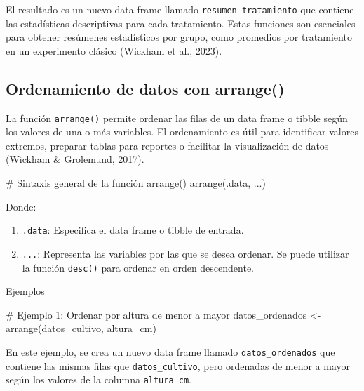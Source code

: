 \documentclass[
  spanish,
  a4paper,
  DIV=11,
  numbers=noendperiod,
  onepage,
  openany]{scrreprt}
\newenvironment{Shaded}{\begin{snugshade}}{\end{snugshade}}
\newcommand{\CommentTok}[1]{\textcolor[rgb]{0.37,0.37,0.37}{#1}}
\newcommand{\FunctionTok}[1]{\textcolor[rgb]{0.28,0.35,0.67}{#1}}
\newcommand{\NormalTok}[1]{\textcolor[rgb]{0.00,0.23,0.31}{#1}}
\newcommand{\OtherTok}[1]{\textcolor[rgb]{0.00,0.23,0.31}{#1}}
\begin{document}
El resultado es un nuevo data frame llamado
\texttt{resumen\_tratamiento} que contiene las estadísticas descriptivas
para cada tratamiento. Estas funciones son esenciales para obtener
resúmenes estadísticos por grupo, como promedios por tratamiento en un
experimento clásico (Wickham et al., 2023).

\subsection{Ordenamiento de datos con
arrange()}\label{ordenamiento-de-datos-con-arrange}

La función \texttt{arrange()} permite ordenar las filas de un data frame
o tibble según los valores de una o más variables. El ordenamiento es
útil para identificar valores extremos, preparar tablas para reportes o
facilitar la visualización de datos (Wickham \& Grolemund, 2017).

\begin{Shaded}
\begin{Highlighting}[]
\CommentTok{\# Sintaxis general de la función arrange()}
\FunctionTok{arrange}\NormalTok{(.data, ...)}
\end{Highlighting}
\end{Shaded}

Donde:

\begin{enumerate}
\def\labelenumi{\arabic{enumi}.}
\item
  \texttt{.data}: Especifica el data frame o tibble de entrada.
\item
  \texttt{...}: Representa las variables por las que se desea ordenar.
  Se puede utilizar la función \texttt{desc()} para ordenar en orden
  descendente.
\end{enumerate}

Ejemplos

\begin{Shaded}
\begin{Highlighting}[]
\CommentTok{\# Ejemplo 1: Ordenar por altura de menor a mayor}
\NormalTok{datos\_ordenados }\OtherTok{\textless{}{-}} \FunctionTok{arrange}\NormalTok{(datos\_cultivo, altura\_cm)}
\end{Highlighting}
\end{Shaded}

En este ejemplo, se crea un nuevo data frame llamado
\texttt{datos\_ordenados} que contiene las mismas filas que
\texttt{datos\_cultivo}, pero ordenadas de menor a mayor según los
valores de la columna \texttt{altura\_cm}.
\end{document}
